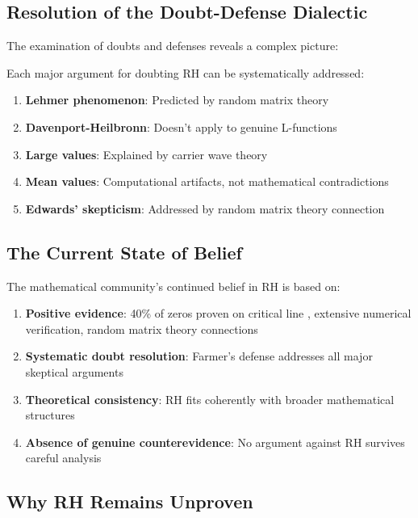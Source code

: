 \subsection{Resolution of the Doubt-Defense Dialectic}
\label{subsec:dialectic_resolution}

The examination of doubts and defenses reveals a complex picture:

\begin{theorem}
Each major argument for doubting RH can be systematically addressed:
\begin{enumerate}
\item \textbf{Lehmer phenomenon}: Predicted by random matrix theory
\item \textbf{Davenport-Heilbronn}: Doesn't apply to genuine L-functions  
\item \textbf{Large values}: Explained by carrier wave theory
\item \textbf{Mean values}: Computational artifacts, not mathematical contradictions
\item \textbf{Edwards' skepticism}: Addressed by random matrix theory connection
\end{enumerate}
\end{theorem}

\subsection{The Current State of Belief}
\label{subsec:current_belief}

\begin{theorem}
The mathematical community's continued belief in RH is based on:
\begin{enumerate}
\item \textbf{Positive evidence}: 40\% of zeros proven on critical line \cite{conrey1989}, extensive numerical verification, random matrix theory connections
\item \textbf{Systematic doubt resolution}: Farmer's defense addresses all major skeptical arguments
\item \textbf{Theoretical consistency}: RH fits coherently with broader mathematical structures
\item \textbf{Absence of genuine counterevidence}: No argument against RH survives careful analysis
\end{enumerate}
\end{theorem}

\subsection{Why RH Remains Unproven}
\label{subsec:why_unproven}

